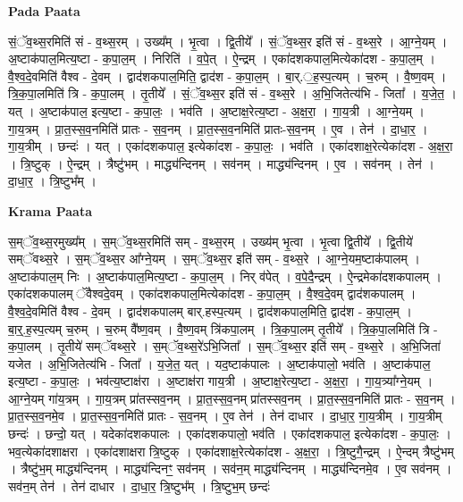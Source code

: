\documentclass[17pt]{extarticle}
\begin{document}
\textbf{Pada Paata} \newline

सं॒ॅव॒थ्स॒रमिति॑ सं - व॒थ्स॒रम् । उख्य᳚म् । भृ॒त्वा । द्वि॒तीये᳚ । सं॒ॅव॒थ्स॒र इति॑ सं - व॒थ्स॒रे । आ॒ग्ने॒यम् । अ॒ष्टाक॑पाल॒मित्य॒ष्टा - क॒पा॒ल॒म् । निरिति॑ । व॒पे॒त् । ऐ॒न्द्रम् । एका॑दशकपाल॒मित्येका॑दश - क॒पा॒ल॒म् । वै॒श्व॒दे॒वमिति॑ वैश्व - दे॒वम् । द्वाद॑शकपाल॒मिति॒ द्वाद॑श - क॒पा॒ल॒म् । बा॒र्.॒ह॒स्प॒त्यम् । च॒रुम् । वै॒ष्ण॒वम् । त्रि॒क॒पा॒लमिति॑ त्रि - क॒पा॒लम् । तृ॒तीये᳚ । सं॒ॅव॒थ्स॒र इति॑ सं - व॒थ्स॒रे । अ॒भि॒जितेत्य॑भि - जिता᳚ । य॒जे॒त॒ । यत् । अ॒ष्टाक॑पाल॒ इत्य॒ष्टा - क॒पा॒लः॒ । भव॑ति । अ॒ष्टाक्ष॒रेत्य॒ष्टा - अ॒क्ष॒रा॒ । गा॒य॒त्री । आ॒ग्ने॒यम् । गा॒य॒त्रम् । प्रा॒त॒स्स॒व॒नमिति॑ प्रातः - स॒व॒नम् । प्रा॒त॒स्स॒व॒नमिति॑ प्रातः-स॒व॒नम् । ए॒व । तेन॑ । दा॒धा॒र॒ । गा॒य॒त्रीम् । छन्दः॑ । यत् । एका॑दशकपाल॒ इत्येका॑दश - क॒पा॒लः॒ । भव॑ति । एका॑दशाक्ष॒रेत्येका॑दश - अ॒क्ष॒रा॒ । त्रि॒ष्टुक् । ऐ॒न्द्रम् । त्रैष्टु॑भम् । माद्ध्य॑न्दिनम् । सव॑नम् । माद्ध्य॑न्दिनम् । ए॒व । सव॑नम् । तेन॑ । दा॒धा॒र॒ । त्रि॒ष्टुभ᳚म् ।  \newline


\textbf{Krama Paata} \newline

स॒म्ॅव॒थ्स॒रमुख्य᳚म् । स॒म्ॅव॒थ्स॒रमिति॑ सम् - व॒थ्स॒रम् । उख्य॑म् भृ॒त्वा । भृ॒त्वा द्वि॒तीये᳚ । द्वि॒तीये॑ सम्ॅवथ्स॒रे । स॒म्ॅव॒थ्स॒र आ᳚ग्ने॒यम् । स॒म्ॅव॒थ्स॒र इति॑ सम् - व॒थ्स॒रे । आ॒ग्ने॒यम॒ष्टाक॑पालम् । अ॒ष्टाक॑पाल॒म् निः । अ॒ष्टाक॑पाल॒मित्य॒ष्टा - क॒पा॒ल॒म् । निर् व॑पेत् । व॒पे॒दै॒न्द्रम् । ऐ॒न्द्रमेका॑दशकपालम् । एका॑दशकपालम् ॅवैश्वदे॒वम् । एका॑दशकपाल॒मित्येका॑दश - क॒पा॒ल॒म् । वै॒श्व॒दे॒वम् द्वाद॑शकपालम् । वै॒श्व॒दे॒वमिति॑ वैश्व - दे॒वम् । द्वाद॑शकपालम् बार्.हस्प॒त्यम् । द्वाद॑शकपाल॒मिति॒ द्वाद॑श - क॒पा॒ल॒म् । बा॒र्॒.ह॒स्प॒त्यम् च॒रुम् । च॒रुम् वै᳚ष्ण॒वम् । वै॒ष्ण॒वम् त्रि॑कपा॒लम् । त्रि॒क॒पा॒लम् तृ॒तीये᳚ । त्रि॒क॒पा॒लमिति॑ त्रि - क॒पा॒लम् । तृ॒तीये॑ सम्ॅवथ्स॒रे । स॒म्ॅव॒थ्स॒रे॑ऽभि॒जिता᳚ । स॒म्ॅव॒थ्स॒र इति॑ सम् - व॒थ्स॒रे । अ॒भि॒जिता॑ यजेत । अ॒भि॒जितेत्य॑भि - जिता᳚ । य॒जे॒त॒ यत् । यद॒ष्टाक॑पालः । अ॒ष्टाक॑पालो॒ भव॑ति । अ॒ष्टाक॑पाल॒ इत्य॒ष्टा - क॒पा॒लः॒ । भव॑त्य॒ष्टाक्ष॑रा । अ॒ष्टाक्ष॑रा गाय॒त्री । अ॒ष्टाक्ष॒रेत्य॒ष्टा - अ॒क्ष॒रा॒ । गा॒य॒त्र्या᳚ग्ने॒यम् । आ॒ग्ने॒यम् गा॑य॒त्रम् । गा॒य॒त्रम् प्रा॑तस्सव॒नम् । प्रा॒त॒स्स॒व॒नम् प्रा॑तस्सव॒नम् । प्रा॒त॒स्स॒व॒नमिति॑ प्रातः - स॒व॒नम् । प्रा॒त॒स्स॒व॒नमे॒व । प्रा॒त॒स्स॒व॒नमिति॑ प्रातः - स॒व॒नम् । ए॒व तेन॑ । तेन॑ दाधार । दा॒धा॒र॒ गा॒य॒त्रीम् । गा॒य॒त्रीम् छन्दः॑ । छन्दो॒ यत् । यदेका॑दशकपालः । एका॑दशकपालो॒ भव॑ति । एका॑दशकपाल॒ इत्येका॑दश - क॒पा॒लः॒ । भव॒त्येका॑दशाक्षरा । एका॑दशाक्षरा त्रि॒ष्टुक् । एका॑दशाक्ष॒रेत्येका॑दश - अ॒क्ष॒रा॒ । त्रि॒ष्टुगै॒न्द्रम् । ऐ॒न्दम् त्रैष्टु॑भम् । त्रैष्टु॑भ॒म् माद्ध्य॑न्दिनम् । माद्ध्य॑न्दिनꣳ॒॒ सव॑नम् । सव॑न॒म् माद्ध्य॑न्दिनम् । माद्ध्य॑न्दिनमे॒व । ए॒व सव॑नम् । सव॑न॒म् तेन॑ । तेन॑ दाधार । दा॒धा॒र॒ त्रि॒ष्टुभ᳚म् । त्रि॒ष्टुभ॒म् छन्दः॑ \newline
\end{document}

